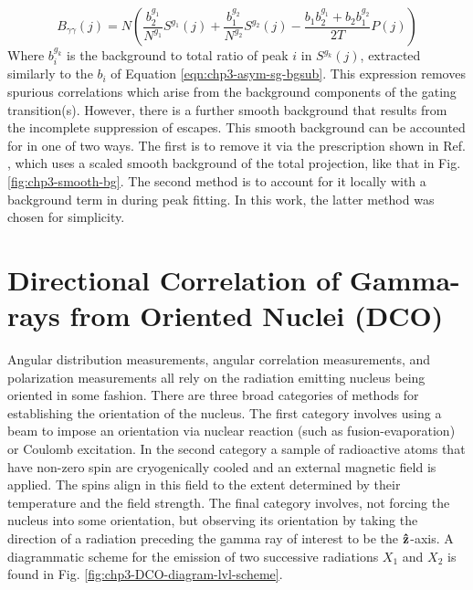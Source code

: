 \begin{equation}
\label{eqn:chp3-asym-bg-dg-exp}
B_{\gamma{}\gamma{}}(j)=N\left(\frac{b^{g_1}_2}{N^{g_1}}S^{g_1}(j) + \frac{b^{g_2}_1}{N^{g_2}}S^{g_2}(j) - \frac{b_1b^{g_1}_2+b_2b^{g_2}_1}{2T}P(j) \right)
\end{equation}
Where $b^{g_k}_i$ is the background to total ratio of peak $i$ in $S^{g_k}(j)$, extracted similarly to the $b_i$ of Equation \ref{eqn:chp3-asym-sg-bgsub}. This expression removes spurious correlations which arise from the background components of the gating transition(s). However, there is a further smooth background that results from the incomplete suppression of escapes. This smooth background can be accounted for in one of two ways. The first is to remove it via the prescription shown in Ref. \cite{asymBGSub}, which uses a scaled smooth background of the total projection, like that in Fig. \ref{fig:chp3-smooth-bg}. The second method is to account for it locally with a background term in during peak fitting. In this work, the latter method was chosen for simplicity.

\section{Directional Correlation of Gamma-rays from Oriented Nuclei (DCO)}
\label{sec:exp-pr-data-ang}
Angular distribution measurements, angular correlation measurements, and polarization measurements all rely on the radiation emitting nucleus being oriented in some fashion. There are three broad categories of methods for establishing the orientation of the nucleus. The first category involves using a beam to impose an orientation via nuclear reaction (such as fusion-evaporation) or Coulomb excitation. In the second category a sample of radioactive atoms that have non-zero spin are cryogenically cooled and an external magnetic field is applied. The spins align in this field to the extent determined by their temperature and the field strength. The final category involves, not forcing the nucleus into some orientation, but observing its orientation by taking the direction of a radiation preceding the gamma ray of interest to be the $\boldsymbol{\hat{\textbf{z}}}$-axis. A diagrammatic scheme for the emission of two successive radiations $X_1$ and $X_2$ is found in Fig. \ref{fig:chp3-DCO-diagram-lvl-scheme}.

